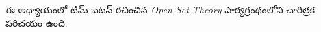 \documentclass[../../../include/open-logic-chapter]{subfiles}
\begin{document}
	

\begin{editorial}
ఈ అధ్యాయంలో టిమ్ బటన్ రచించిన \emph{Open Set Theory} పాఠ్యగ్రంథంలోని చారిత్రక పరిచయం ఉంది.
\end{editorial}

\end{document}
